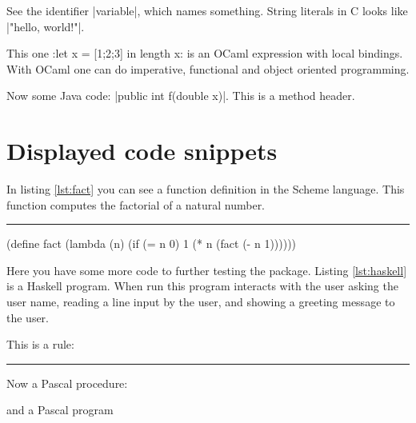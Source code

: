 \documentclass[10pt]{article}
\begin{document}
See the identifier
\pyginline[inline method=efbox,colback=green!25]|variable|, which names
something. String literals in C looks like
\pyginline[lang=c,inline method=tcbox,colback=blue!20,boxrule=2pt]|"hello, world!\n"|.


This one
\pyginline[lang=ocaml,font=\ttfamily\scriptsize,topline=false]:let x = [1;2;3] in length x:
is an OCaml expression with local bindings. With OCaml one can do
imperative, functional and object oriented programming.

Now some Java code:
\pyginline[lang=java,sty=colorful,font=\ttfamily\itshape,linewidth=1pt]|public int f(double x)|.
This is a method header.

\section{Displayed code snippets}


In listing \ref{lst:fact} you can see a function definition in the
Scheme language. This function computes the factorial of a natural
number.
\newline\rule{\linewidth}{2pt}
\begin{pygmented}[
  sty=emacs,
  linenos,
  label=lst:fact,
  caption=A Scheme function.
  ]
(define fact
    (lambda (n)
        (if (= n 0)
            1
            (* n (fact (- n 1))))))
\end{pygmented}

Here you have some more code to further testing the package. Listing
\ref{lst:haskell} is a Haskell program. When run this program interacts
with the user asking the user name, reading a line input by the user,
and showing a greeting message to the user.


This is a rule:

\noindent\rule{\linewidth}{2pt}

Now a Pascal procedure:

and a Pascal program
\end{document}
